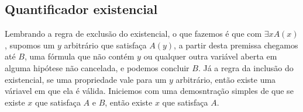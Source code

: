 \subsection{Quantificador existencial}
Lembrando a regra de exclusão do existencial, o que fazemos é que com $\exists x A(x)$, supomos um $y$
arbitrário que satisfaça $A(y)$, a partir desta premissa chegamos até $B$, uma fórmula que não contém
$y$ ou qualquer outra variável aberta em alguma hipótese não cancelada, e podemos concluir $B$.
\newline Já a regra da inclusão do existencial, se uma propriedade vale para um $y$ arbitrário, então
existe uma váriavel em que ela é válida.
\newline Iniciemos com uma demosntração simples de que se existe $x$ que satisfaça $A$ e $B$, então 
existe $x$ que satisfaça $A$.


